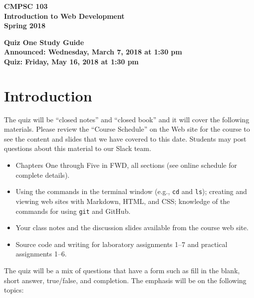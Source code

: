 \documentclass[11pt]{article}
\newcommand{\assignmentduedate}{May 16}
\newcommand{\assignmentassignedate}{March 7}
\newcommand{\assignmentnumber}{One}
\newcommand{\labyear}{2018}
\newcommand{\assignedday}{Wednesday}
\newcommand{\dueday}{Friday}
\newcommand{\labtime}{1:30 pm}
\newcommand{\assigneddate}{Announced: \assignedday, \assignmentassignedate, \labyear{} at \labtime{}}
\newcommand{\duedate}{Quiz: \dueday, \assignmentduedate, \labyear{} at \labtime{}}
\newcommand{\program}[1]{\lstinline{#1}}
\newcommand{\guidetitle}[1]
{
  \begin{center}
    \begin{center}
      \bf
      CMPSC 103\\Introduction to Web Development\\
      Spring 2018\\
      \medskip
    \end{center}
    \bf
    #1
  \end{center}
}
\begin{document}
\thispagestyle{empty}

\guidetitle{Quiz \assignmentnumber{} Study Guide \\ \assigneddate{} \\ \duedate{}}

\section*{Introduction}

\noindent
The quiz will be ``closed notes'' and ``closed book'' and it will cover the
following materials. Please review the ``Course Schedule'' on the Web site for
the course to see the content and slides that we have covered to this date.
Students may post questions about this material to our Slack team.

\begin{itemize}

  \itemsep 0in

  \item Chapters One through Five in FWD, all sections (see online schedule for
    complete details).

  \item Using the commands in the terminal window (e.g., \program{cd} and
    \program{ls}); creating and viewing web sites with Markdown, HTML, and CSS;
    knowledge of the commands for using \program{git} and GitHub.

  \item Your class notes and the discussion slides available from the course web
    site.

  \item Source code and writing for laboratory assignments 1--7 and practical
    assignments 1--6.

\end{itemize}

\noindent The quiz will be a mix of questions that have a form such as fill in
the blank, short answer, true/false, and completion. The emphasis will be on the
following topics:
\end{document}

